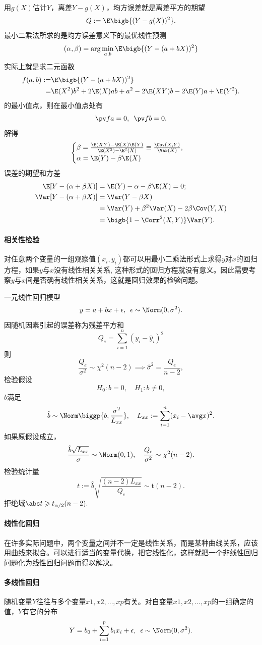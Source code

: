 用$g(X)$估计$Y$，离差$Y-g(X)$，均方误差就是离差平方的期望
\[
	Q:=\E\bigb{(Y-g(X))^2}.
\]
最小二乘法所求的是均方误差意义下的最优线性预测
\[
	(\alpha,\beta)=\arg\min_{a,b}\E\bigb{(Y-(a+bX))^2}
\]
实际上就是求二元函数
\begin{align*}
	f(a,b):=&{}\E\bigb{(Y-(a+bX))^2}\\
	=&{}\E(X^2)b^2+2\E(X)ab+a^2-2\E(XY)b-2\E(Y)a+\E(Y^2).
\end{align*}
的最小值点，则在最小值点处有
\[
	\pv fa=0,\enspace\pv fb=0.
\]
解得
\begin{equation}
	\begin{cases}
		\beta=\frac{\E(XY)-\E(X)\E(Y)}{\E(X^2)-\E^2(X)}\equiv\frac{\Cov(X,Y)}{\Var(X)},\\
		\alpha=\E(Y)-\beta\E(X)
	\end{cases}
\end{equation}
误差的期望和方差
\begin{align*}
	\E[Y-(\alpha+\beta X)]&=\E(Y)-\alpha-\beta\E(X)=0;\\
	\Var[Y-(\alpha+\beta X)]&=\Var(Y-\beta X)\\
	&=\Var(Y)+\beta^2\Var(X)-2\beta\Cov(Y,X)\\
	&=%
	\bigb{1-\Corr^2(X,Y)}\Var(Y).
\end{align*}
\paragraph{相关性检验}
对任意两个变量的一组观察值$ {(x_i, y_i)} $都可以用最小二乘法形式上求得$ y$对$ x $的回归方程，如果$ y $与$ x $没有线性相关关系, 这种形式的回归方程就没有意义。因此需要考察$ y $与$ x $间是否确有线性相关关系，这就是回归效果的检验问题。

一元线性回归模型
\[
	y=a+bx+\epsilon,\enspace\epsilon\sim\Norm(0,\sigma^2).
\]
因随机因素引起的误差称为残差平方和
\[
	Q_e=\sum_{i=1}^n(y_i-\hat y_i)^2
\]
则
\[
	\frac{Q_e}{\sigma^2}\sim\chi^2(n-2)\implies\hat\sigma^2=\frac{Q_e}{n-2},
\]
检验假设 
\[
	H_0:b=0,\quad H_1:b\neq 0,
\]
$\hat b$满足 
\[
	\hat b\sim\Norm\biggp{b,\frac{\sigma^2}{L_{xx}}},\quad L_{xx}:=\sum_{i=1}^n(x_i-\avg x)^2.
\]
如果原假设成立，
\[
	\frac{\hat b\sqrt{L_{xx}}}{\sigma}\sim\Norm(0,1),\quad\frac{Q_e}{\sigma^2}\sim\chi^2(n-2).
\]
检验统计量 
\begin{equation}
	t:=\hat b\sqrt{\frac{(n-2)L_{xx}}{Q_e}}\sim\mathrm t(n-2).
\end{equation}
拒绝域$\abs t\geqslant t_{\alpha/2}(n-2).$
\paragraph{线性化回归}
在许多实际问题中，两个变量之间并不一定是线性关系，而是某种曲线关系，应该用曲线来拟合。可以进行适当的变量代换，把它线性化，这样就把一个非线性回归问题化为线性回归问题而得以解决。
\paragraph{多线性回归}
随机变量$ Y $往往与多个变量$ x1, x2, \ldots , xp $有关。对自变量$ x1, x2, \ldots, xp $的一组确定的值，$Y $有它的分布
\[
	Y=b_0+\sum_{i=1}^pb_ix_i+\epsilon,\enspace\epsilon\sim\Norm(0,\sigma^2).
\]